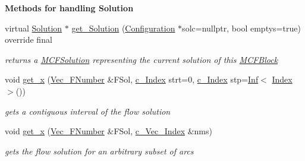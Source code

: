 \begin{Indent}\textbf{ Methods for handling Solution}\par
\begin{DoxyCompactItemize}
\item 
virtual \mbox{\hyperlink{class_s_m_spp__di__unipi__it_1_1_solution}{Solution}} $\ast$ \mbox{\hyperlink{class_s_m_spp__di__unipi__it_1_1_m_c_f_block_a55335e0e301e1bfa9592e8532bfd61e7}{get\+\_\+\+Solution}} (\mbox{\hyperlink{class_s_m_spp__di__unipi__it_1_1_configuration}{Configuration}} $\ast$solc=nullptr, bool emptys=true) override final
\begin{DoxyCompactList}\small\item\em returns a \mbox{\hyperlink{class_s_m_spp__di__unipi__it_1_1_m_c_f_solution}{M\+C\+F\+Solution}} representing the current solution of this \mbox{\hyperlink{class_s_m_spp__di__unipi__it_1_1_m_c_f_block}{M\+C\+F\+Block}} \end{DoxyCompactList}\item 
void \mbox{\hyperlink{class_s_m_spp__di__unipi__it_1_1_m_c_f_block_a4f7acee4b29dfaec7b83c2ad3aea5f46}{get\+\_\+x}} (\mbox{\hyperlink{class_s_m_spp__di__unipi__it_1_1_m_c_f_block_a3797c4b5074703bb8488c17055606ce4}{Vec\+\_\+\+F\+Number}} \&F\+Sol, \mbox{\hyperlink{class_s_m_spp__di__unipi__it_1_1_m_c_f_block_aee6156e2ce80720d57a082d80f39d8cc}{c\+\_\+\+Index}} strt=0, \mbox{\hyperlink{class_s_m_spp__di__unipi__it_1_1_m_c_f_block_aee6156e2ce80720d57a082d80f39d8cc}{c\+\_\+\+Index}} stp=\mbox{\hyperlink{class_s_m_spp__di__unipi__it_1_1_inf}{Inf}}$<$ \mbox{\hyperlink{class_s_m_spp__di__unipi__it_1_1_m_c_f_block_ad53d6229d7ec28555a9c9c2fd9abf773}{Index}} $>$())
\begin{DoxyCompactList}\small\item\em gets a contiguous interval of the flow solution \end{DoxyCompactList}\item 
void \mbox{\hyperlink{class_s_m_spp__di__unipi__it_1_1_m_c_f_block_a2528364a2b42722a661adfecd1c33b3f}{get\+\_\+x}} (\mbox{\hyperlink{class_s_m_spp__di__unipi__it_1_1_m_c_f_block_a3797c4b5074703bb8488c17055606ce4}{Vec\+\_\+\+F\+Number}} \&F\+Sol, \mbox{\hyperlink{class_s_m_spp__di__unipi__it_1_1_m_c_f_block_a03461123d4f6090aefeb97ef653d3f2b}{c\+\_\+\+Vec\+\_\+\+Index}} \&nms)
\begin{DoxyCompactList}\small\item\em gets the flow solution for an arbitrary subset of arcs \end{DoxyCompactList}\item 

\end{DoxyCompactItemize}
\end{Indent}
